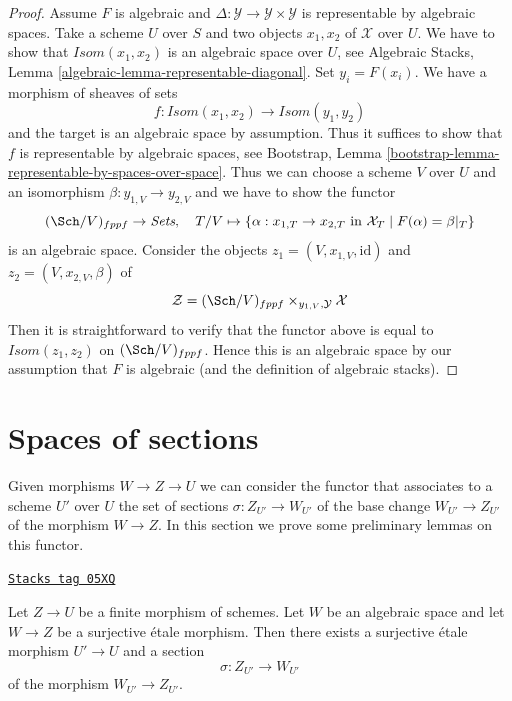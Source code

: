 \begin{proof}
Assume $F$ is algebraic and
$\Delta : \mathcal{Y} \to \mathcal{Y} \times \mathcal{Y}$
is representable by algebraic spaces.
Take a scheme $U$ over $S$ and two objects $x_1, x_2$ of
$\mathcal{X}$ over $U$.
We have to show that $\mathit{Isom}(x_1, x_2)$ is an algebraic space
over $U$, see
Algebraic Stacks, Lemma \ref{algebraic-lemma-representable-diagonal}.
Set $y_i = F(x_i)$. We have a morphism of sheaves of sets
$$
f : \mathit{Isom}(x_1, x_2) \to \mathit{Isom}(y_1, y_2)
$$
and the target is an algebraic space by assumption.
Thus it suffices to show that $f$ is representable by
algebraic spaces, see Bootstrap, Lemma
\ref{bootstrap-lemma-representable-by-spaces-over-space}.
Thus we can choose a scheme $V$ over $U$ and an
isomorphism $\beta : y_{1, V} \to y_{2, V}$ and
we have to show the functor
$$
(\Sch/V)_{fppf} \to \textit{Sets},\quad
T/V \mapsto \{\alpha : x_{1, T} \to x_{2, T}
\text{ in }\mathcal{X}_T \mid F(\alpha) = \beta|_T\}
$$
is an algebraic space. Consider the objects
$z_1 = (V, x_{1, V}, \text{id})$ and
$z_2 = (V, x_{2, V}, \beta)$ of
$$
\mathcal{Z} = (\Sch/V)_{fppf} \times_{y_{1, V}, \mathcal{Y}} \mathcal{X}
$$
Then it is straightforward to verify that
the functor above is equal to $\mathit{Isom}(z_1, z_2)$
on $(\Sch/V)_{fppf}$. Hence this is an algebraic space
by our assumption that $F$ is algebraic (and the definition
of algebraic stacks).
\end{proof}

\section{Spaces of sections}
\label{criteria-section-spaces-sections}
Given morphisms $W \to Z \to U$ we can consider the functor that associates
to a scheme $U'$ over $U$ the set of sections $\sigma : Z_{U'} \to W_{U'}$
of the base change $W_{U'} \to Z_{U'}$ of the morphism $W \to Z$.
In this section we prove some preliminary lemmas on this functor.

\begin{lemma}
\label{criteria-lemma-surjection-space-of-sections}
\href{https://stacks.math.columbia.edu/tag/05XQ}{\texttt{Stacks tag 05XQ}}

Let $Z \to U$ be a finite morphism of schemes.
Let $W$ be an algebraic space and let $W \to Z$ be a
surjective \'etale morphism. Then there exists a surjective
\'etale morphism $U' \to U$ and a section
$$
\sigma : Z_{U'} \to W_{U'}
$$
of the morphism $W_{U'} \to Z_{U'}$.
\end{lemma}

